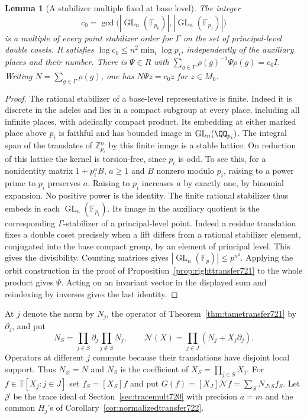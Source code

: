 \documentclass[a4paper,11pt]{article}
\newtheorem{lemma}[proposition]{Lemma}
\theoremstyle{definition}
\theoremstyle{remark}
\newcommand{\ZZ}{\mathbb Z}\newcommand{\ord}{\operatorname{ord}}
\numberwithin{equation}{section}
\newcommand{\GL}{\operatorname{GL}}
\begin{document}
\begin{lemma}[A stabilizer multiple fixed at base level]
\leavevmode\label{lem:basestabilizer723}
The integer
\[
 c_0=\gcd\bigl(|\GL_n(\mathbb F_{p_0})|,
                |\GL_n(\mathbb F_{p_1})|\bigr)
\]
is a multiple of every point stabilizer order for \(\Gamma\)
on the set of principal-level double cosets. It satisfies
\(\log c_0\le n^2\min_i\log p_i\), independently of the
auxiliary places and their number. There is \(\Psi\in R\)
with \(\sum_{g\in\Gamma}\rho(g)^{-1}\Psi\rho(g)=c_0 I\).
Writing \(N=\sum_{g\in\Gamma}\rho(g)\), one has
\(N\Psi z=c_0 z\) for \(z\in M_0\).
\end{lemma}
\begin{proof}
The rational stabilizer of a base-level representative is
finite. Indeed it is discrete in the adeles and lies in a
compact subgroup at every place, including all infinite
places, with adelically compact product. Its embedding
at either marked place above \(p_i\) is faithful and has
bounded image in \(\GL_n(\QQ_{p_i})\).
The integral span of the translates of \(\ZZ_{p_i}^n\) by
this finite image is a stable lattice. On reduction of this
lattice the kernel is torsion-free, since \(p_i\) is odd.
To see this, for a nonidentity matrix \(1+p_i^a B\), \(a\ge1\)
and \(B\) nonzero modulo \(p_i\), raising to a power prime to
\(p_i\) preserves \(a\). Raising to \(p_i\) increases \(a\)
by exactly one, by binomial expansion. No positive power is
the identity. The finite rational stabilizer thus embeds in
each \(\GL_n(\mathbb F_{p_i})\). Its image in the auxiliary
quotient is the corresponding \(\Gamma\)-stabilizer of a
principal-level point. Indeed a residue translation fixes a
double coset precisely when a lift differs from a rational
stabilizer element, conjugated into the base compact group,
by an element of principal level. This gives the divisibility.
Counting matrices gives \(|\GL_n(\mathbb F_p)|\le p^{n^2}\).
Applying the orbit construction in the proof of
Proposition~\ref{prop:righttransfer721} to the whole product
gives \(\Psi\). Acting on an invariant vector in the displayed
sum and reindexing by inverses gives the last identity.
\end{proof}

At \(j\) denote the norm by \(N_j\), the operator of
Theorem~\ref{thm:tametransfer721} by \(\partial_j\), and put
\[
    N_S=\prod_{j\in S}\partial_j\prod_{j\notin S}N_j,\qquad
    \mathcal N(X)=\prod_{j\in J}(N_j+X_j\partial_j).
\]
Operators at different \(j\) commute because their translations
have disjoint local support. Thus \(N_\varnothing=N\) and
\(N_S\) is the coefficient of \(X_S=\prod_{j\in S}X_j\).
For \(f\in\mathbb T[X_j:j\in J]\) set \(f_S=[X_S]f\) and put
\(G(f)=[X_J]\mathcal N f=\sum_S N_{J\setminus S}f_S\).
Let \(\mathcal J\) be the trace ideal of
Section~\ref{sec:tracemult720} with precision \(a=m\) and the
common \(H_j\)'s of Corollary~\ref{cor:normalizedtransfer722}.
\end{document}
